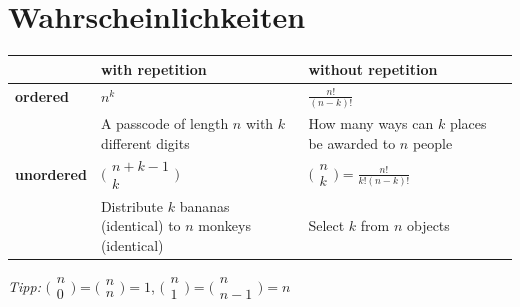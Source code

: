 \documentclass[11pt]{article}
\begin{document}
\section{Wahrscheinlichkeiten}

\begin{table}[H]
\centering
\begin{tabular}{|p{2cm}|p{6cm}|p{6cm}|}
\hline
                   & \textbf{with repetition} & \textbf{without repetition} \\\hline
\textbf{ordered}   & $n^k$                         							 	  & $\frac{n!}{(n-k)!}$    \\\cline{2-3}
				   & A passcode of length $n$ with $k$ different digits           & How many ways can $k$ places be awarded to $n$ people                       \\\hline
\textbf{unordered} & $\bigl(\begin{smallmatrix}n+k-1\\k \end{smallmatrix} \bigr)$ & $\bigl(\begin{smallmatrix}n\\k \end{smallmatrix} \bigr) = \frac{n!}{k!(n-k)!}$ \\\cline{2-3}
				   & Distribute $k$ bananas (identical) to $n$ monkeys (identical)   & Select $k$ from $n$ objects                             \\\hline
\end{tabular}
\end{table}

\emph{Tipp:} $\bigl(\begin{smallmatrix}n\\0 \end{smallmatrix} \bigr) = \bigl(\begin{smallmatrix}n\\n \end{smallmatrix} \bigr) = 1$, $\bigl(\begin{smallmatrix}n\\1 \end{smallmatrix} \bigr) = \bigl(\begin{smallmatrix}n\\n-1 \end{smallmatrix} \bigr) = n$ \\
\end{document}
